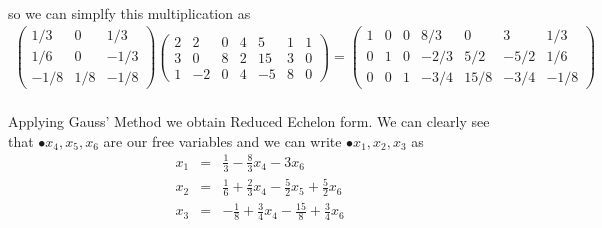 \documentclass[11pt]{article}
\begin{document}
\paragraph{}so we can simplfy this multiplication as
\begin{eqnarray*}
\begin{pmatrix}
	1/3 & 0 & 1/3 \\
	1/6 & 0 & -1/3 \\
	-1/8 & 1/8 & -1/8
\end{pmatrix}
\left(\begin{array}{cccccc|c}  
	2 & 2 & 0 & 4 & 5 & 1 & 1\\
    3 & 0 & 8 & 2 & 15 & 3 & 0\\
    1 & -2 & 0 & 4 & -5 & 8 & 0
\end{array}\right)
=
\left(\begin{array}{cccccc|c} 
 	1 & 0 & 0 & 8/3 & 0 & 3 & 1/3\\
	0 & 1 & 0 & -2/3 & 5/2 & -5/2 & 1/6\\
    0 & 0 & 1 & -3/4 & 15/8 & -3/4 & -1/8
\end{array}\right)
\end{eqnarray*}

\paragraph{}Applying Gauss' Method we obtain Reduced Echelon form. We can clearly see that $\mathbf{•}{x_4,x_5,x_6}$ are our free variables and we can write $\mathbf{•}{x_1,x_2,x_3}$ as
\begin{eqnarray*}
x_1&=&\frac{1}{3}-\frac{8}{3}x_4-3x_6
\\x_2&=&\frac{1}{6}+\frac{2}{3}x_4-\frac{5}{2}x_5+\frac{5}{2}x_6
\\x_3&=&-\frac{1}{8}+\frac{3}{4}x_4-\frac{15}{8}+\frac{3}{4}x_6
\end{eqnarray*}
\end{document}

